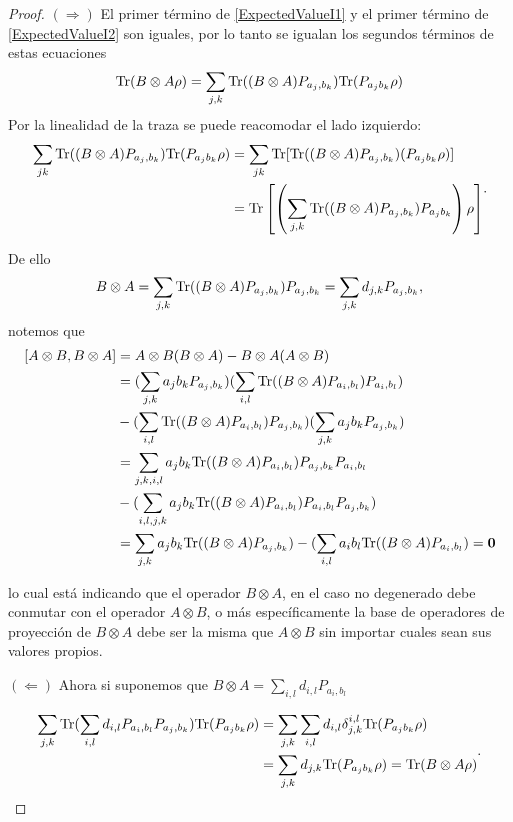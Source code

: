 \documentclass[12pt,oneside]{book}\raggedbottom{}
\begin{document}
\begin{proof}
	$(\Rightarrow)$
El primer término de {\ref{ExpectedValueI1}} y el primer término de {\ref{ExpectedValueI2}} son iguales, por lo tanto se igualan los segundos términos
 de estas ecuaciones \[{\rm Tr}(B\otimes A \rho)=\sum_{j,k}{\rm Tr}((B\otimes A) P_{a_j,b_k}){\rm Tr}(P_{a_j b_k}\rho )\] Por la linealidad de la traza se puede reacomodar el lado izquierdo: \[\begin{split}\sum_{jk}{\rm Tr}((B\otimes A) P_{a_j,b_k}){\rm Tr}(P_{a_j b_k}\rho )&= \sum_{jk}{\rm Tr}[{\rm Tr}((B\otimes A) P_{a_j,b_k})(P_{a_j b_k}\rho )]\\&={\rm Tr}\left[\left(\sum_{j,k}{\rm Tr}((B\otimes A) P_{a_j,b_k})P_{a_j b_k}\right)\rho \right]\end{split}.\]  





De ello  \[B\otimes A=\sum_{j,k} {\rm Tr}((B\otimes A)P_{a_j, b_k})P_{a_j, b_k}=\sum_{j,k}d_{j,k}P_{a_j,b_k},\] notemos que
\[\begin{split}[A\otimes B, B\otimes A ]&= A\otimes B (B\otimes A)-B\otimes A (A\otimes B)\\
&=(\sum_{j,k}a_j b_k P_{a_j, b_k})(\sum_{i,l} {\rm Tr}((B\otimes A)P_{a_i, b_l})P_{a_i, b_l})\\
&- (\sum_{i,l} {\rm Tr}((B\otimes A)P_{a_i, b_l})P_{a_j, b_k})(\sum_{j,k}a_j b_k P_{a_j, b_k})\\
&=\sum_{j,k,i,l}a_j b_k  {\rm Tr}((B\otimes A)P_{a_i, b_l})P_{a_j, b_k}P_{a_i, b_l}\\
&- (\sum_{i,l,j,k} a_j b_k {\rm Tr}((B\otimes A)P_{a_i, b_l})P_{a_i, b_l} P_{a_j, b_k})\\
&=\sum_{j,k}a_j b_k  {\rm Tr}((B\otimes A)P_{a_j, b_k})- (\sum_{i,l} a_i b_l {\rm Tr}((B\otimes A)P_{a_i, b_l})=\mathbf{0}\\
\end{split}\]




lo cual está indicando que el operador \(B\otimes A\), en el caso no degenerado debe conmutar con el operador \(A\otimes B\), o más específicamente la base de operadores de proyección de $B\otimes A$ debe ser la misma que $A\otimes B$ sin importar cuales sean sus valores propios.






$(\Leftarrow)$
Ahora si suponemos que $B\otimes A=\sum_{i,l}d_{i,l}P_{a_i, b_l}$

\[\begin{split}\sum_{j,k}{\rm Tr}( \sum_{i,l}d_{i,l}P_{a_i, b_l} P_{a_j,b_k}){\rm Tr}(P_{a_j b_k}\rho )&=\sum_{j,k}\sum_{i,l}d_{i,l}\delta_{j,k}^{i,l}{\rm Tr}(P_{a_j b_k}\rho )\\&=\sum_{j,k}d_{j,k}{\rm Tr}(P_{a_j b_k}\rho )={\rm Tr}(B\otimes A\rho)\end{split}.\]


\end{proof}
\end{document}
